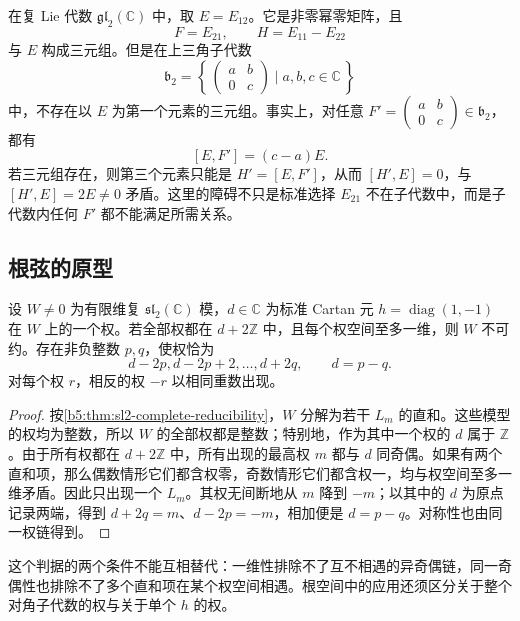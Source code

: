 \begin{example}\label{b5:exm:upper-triangular-no-sl2-triple}
	在复 Lie 代数 \(\mathfrak{gl}_2(\mathbb C)\) 中，取 \(E=E_{12}\)。它是非零幂零矩阵，且
	\[
		F=E_{21},\qquad H=E_{11}-E_{22}
	\]
	与 \(E\) 构成三元组。但是在上三角子代数
	\[
		\mathfrak b_2=\left\{\,
		\begin{pmatrix}a&b\\0&c\end{pmatrix}
		\mid a,b,c\in\mathbb C\,\right\}
	\]
	中，不存在以 \(E\) 为第一个元素的三元组。事实上，对任意
	\(F'=\begin{pmatrix}a&b\\0&c\end{pmatrix}\in\mathfrak b_2\)，都有
	\[
		[E,F']=(c-a)E.
	\]
	若三元组存在，则第三个元素只能是 \(H'=[E,F']\)，从而 \([H',E]=0\)，与 \([H',E]=2E\ne0\) 矛盾。这里的障碍不只是标准选择 \(E_{21}\) 不在子代数中，而是子代数内任何 \(F'\) 都不能满足所需关系。
\end{example}

\subsection{根弦的原型}
\label{b5:subsec:1404:02}

\begin{proposition}\label{b5:prop:sl2-single-string}
	设 \(W\ne0\) 为有限维复 \(\mathfrak{sl}_2(\mathbb C)\) 模，\(d\in\mathbb C\) 为标准 Cartan 元 \(h=\operatorname{diag}(1,-1)\) 在 \(W\) 上的一个权。若全部权都在 \(d+2\mathbb Z\) 中，且每个权空间至多一维，则 \(W\) 不可约。存在非负整数 \(p,q\)，使权恰为
	\[
		d-2p,d-2p+2,\ldots,d+2q,\qquad d=p-q.
	\]
	对每个权 \(r\)，相反的权 \(-r\) 以相同重数出现。
\end{proposition}
\begin{proof}
	按\cref{b5:thm:sl2-complete-reducibility}，\(W\) 分解为若干 \(L_m\) 的直和。这些模型的权均为整数，所以 \(W\) 的全部权都是整数；特别地，作为其中一个权的 \(d\) 属于 \(\mathbb Z\)。由于所有权都在 \(d+2\mathbb Z\) 中，所有出现的最高权 \(m\) 都与 \(d\) 同奇偶。如果有两个直和项，那么偶数情形它们都含权零，奇数情形它们都含权一，均与权空间至多一维矛盾。因此只出现一个 \(L_m\)。其权无间断地从 \(m\) 降到 \(-m\)；以其中的 \(d\) 为原点记录两端，得到 \(d+2q=m\)、\(d-2p=-m\)，相加便是 \(d=p-q\)。对称性也由同一权链得到。
\end{proof}
这个判据的两个条件不能互相替代：一维性排除不了互不相遇的异奇偶链，同一奇偶性也排除不了多个直和项在某个权空间相遇。根空间中的应用还须区分关于整个对角子代数的权与关于单个 \(h\) 的权。

